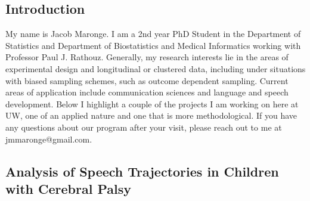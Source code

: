 \documentclass[12pt]{article}
\begin{document}
\begin{multicols}{2} 

\subsection*{Introduction}
My name is Jacob Maronge. I am a 2nd year PhD Student in the Department of Statistics and Department of Biostatistics and Medical Informatics working with Professor Paul J. Rathouz. Generally, my research interests lie in the areas of experimental design and longitudinal or clustered data, including under situations with biased sampling schemes, such as outcome dependent sampling. Current areas of application include communication sciences and language and speech development. Below I highlight a couple of the projects I am working on here at UW, one of an applied nature and one that is more methodological. If you have any questions about our program after your visit, please reach out to me at jmmaronge@gmail.com.

\subsection*{Analysis of Speech Trajectories in Children with Cerebral Palsy}


\end{multicols}
\end{document}
